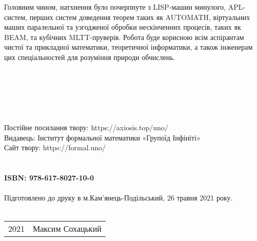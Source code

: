 Головним чином, натхнення було почерпнуте з
LISP-машин минулого, APL-систем, перших систем
доведення теорем таких як AUTOMATH, віртуальних
маших паралельної та узгодженої обробки нескінченних
процесів, таких як BEAM, та кубічних MLTT-пруверів.
Робота буде корисною всім аспірантам чистої та
прикладної математики, теоретичної інформатики,
а також інженерам цих спеціальностей для розуміння
природи обчислень.
\\
\\
\\
\\
\\
\\
\\
Постійне посилання твору: https://axiosis.top/uno/ \\
Видавець: Інститут формальної математики «Групоїд Інфініті» \\
Сайт твору: https://formal.uno/ \\
\\
\\
{\bf ISBN: 978-617-8027-10-0 \hspace{2em}} \\ \\
Підготовлено до друку в м.Кам'янець-Подільський, 26 травня 2021 року.
\\
\\
\begin{tabular}{ll}
\textcopyright{} 2021 & Максим Сохацький
\end{tabular}


\newpage
\cleartorecto
\tableofcontents*
\mainmatter
